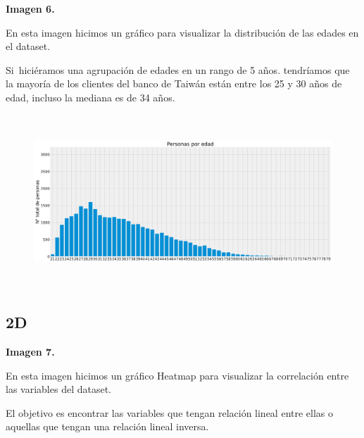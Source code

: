 \documentclass[12pt]{report}
\renewcommand{\_}{\kern-1.5pt\textunderscore\kern-1.5pt}
\begin{document}


\vspace{\baselineskip}
\vspace{\baselineskip}
\begin{justify}
\textbf{Imagen 6.}
\end{justify}
\begin{justify}
En esta imagen hicimos un gráfico para visualizar la distribución de las edades en el dataset.
\end{justify}
\begin{justify}
Si\ hiciéramos una agrupación de edades en un rango de 5 años. tendríamos que la mayoría de los clientes del banco de Taiwán están entre los 25 y 30 años de edad, incluso la mediana es de  34 años.
\end{justify}



\begin{figure}[H]
	\begin{Center}
		\includegraphics[width=6.27in,height=2.57in]{./media/image5.png}
	\end{Center}
\end{figure}




\vspace{\baselineskip}\subsection{2D}
\begin{justify}
\textbf{Imagen 7.}
\end{justify}
\begin{justify}
En esta imagen hicimos un gráfico Heatmap para visualizar la correlación entre las variables del dataset.
\end{justify}
\begin{justify}
El objetivo es encontrar las variables que tengan relación lineal entre ellas o aquellas que tengan una relación lineal inversa.
\end{justify}
\end{document}
